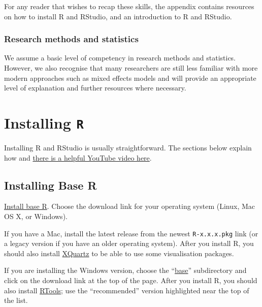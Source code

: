 \documentclass[
  oneside]{book}
\begin{document}
For any reader that wishes to recap these skills, the appendix contains resources on how to install R and RStudio, and an introduction to R and RStudio.

\hypertarget{research-methods-and-statistics}{%
\subsection{Research methods and statistics}\label{research-methods-and-statistics}}

We assume a basic level of competency in research methods and statistics. However, we also recognise that many researchers are still less familiar with more modern approaches such as mixed effects models and will provide an appropriate level of explanation and further resources where necessary.

\hypertarget{appendix-appendices}{%
\appendix}


\hypertarget{installing-r}{%
\chapter{\texorpdfstring{Installing \texttt{R}}{Installing R}}\label{installing-r}}

Installing R and RStudio is usually straightforward. The sections below explain how and \href{https://www.youtube.com/watch?v=lVKMsaWju8w}{there is a helpful YouTube video here}.

\hypertarget{installing-base-r}{%
\section{Installing Base R}\label{installing-base-r}}

\href{https://cran.rstudio.com/}{Install base R}. Choose the download link for your operating system (Linux, Mac OS X, or Windows).

If you have a Mac, install the latest release from the newest \texttt{R-x.x.x.pkg} link (or a legacy version if you have an older operating system). After you install R, you should also install \href{http://xquartz.macosforge.org/}{XQuartz} to be able to use some visualisation packages.

If you are installing the Windows version, choose the ``\href{https://cran.rstudio.com/bin/windows/base/}{base}'' subdirectory and click on the download link at the top of the page. After you install R, you should also install \href{https://cran.rstudio.com/bin/windows/Rtools/}{RTools}; use the ``recommended'' version highlighted near the top of the list.
\end{document}
